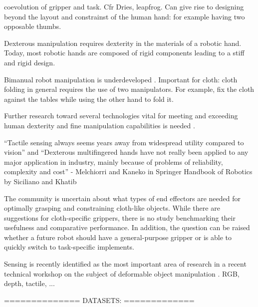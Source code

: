 \documentclass[\home/main.tex]{subfiles}
\begin{document}
coevolution of gripper and task. Cfr Dries, leapfrog. 
Can give rise to designing beyond the layout and constrainst of the human hand: for example having two opposable thumbs. %

Dexterous manipulation requires dexterity in the materials of a robotic hand. Today, most robotic hands are composed of rigid components leading to a stiff and rigid design. %

Bimanual robot manipulation is underdeveloped \autocite{Billard2019}. Important for cloth: cloth folding in general requires the use of two manipulators. For example, fix the cloth against the tables while using the other hand to fold it. 

Further research toward several technologies vital for meeting and exceeding human dexterity and fine manipulation capabilities is needed .

“Tactile sensing always seems years away from widespread utility compared to vision” 
and
“Dexterous multifingered hands have not really been applied to any major application in industry, mainly because of problems of reliability, complexity and cost” 
  - Melchiorri and Kaneko in Springer Handbook of Robotics by Siciliano and Khatib


 The community is uncertain about what types of end effectors are needed for optimally grasping and constraining cloth-like objects. While there are suggestions for cloth-specific grippers, there is no study benchmarking their usefulness and comparative performance. In addition, the question can be raised whether a future robot should have a general-purpose gripper or is able to quickly switch to  task-specific implements.  

 Sensing is recently identified as the most important area of research in a recent technical workshop on the subject of deformable object manipulation \autocite{zhu:hal-02980281}. RGB, depth, tactile, ... 

==============
DATASETS:
=============

\end{document}
